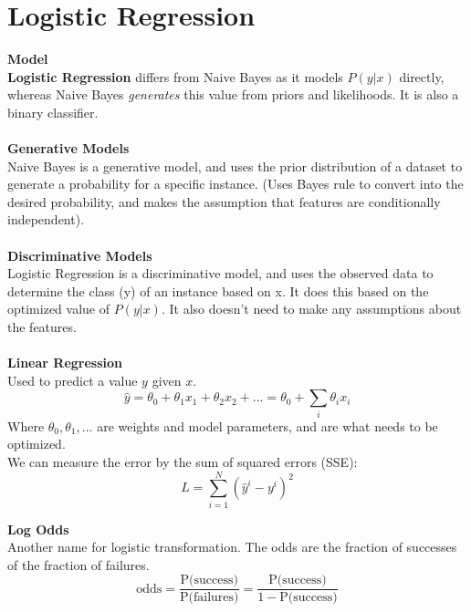 \documentclass[a4paper,10pt]{article}
\begin{document}
\section*{Logistic Regression}
\textcolor{Periwinkle}{\textbf{Model}}\\
\textbf{Logistic Regression} differs from Naive Bayes as it models $P(y|x)$ directly, whereas Naive Bayes \emph{generates} this value from priors and likelihoods. It is also a binary classifier. \\\\
\textcolor{Periwinkle}{\textbf{Generative Models}}\\
Naive Bayes is a generative model, and uses the prior distribution of a dataset to generate a probability for a specific instance. (Uses Bayes rule to convert into the desired probability, and makes the assumption that features are conditionally independent). \\\\
\textcolor{Periwinkle}{\textbf{Discriminative Models}}\\
Logistic Regression is a discriminative model, and uses the observed data to determine the class (y) of an instance based on x. It does this based on the optimized value of $P(y|x)$. It also doesn't need to make any assumptions about the features. \\\\
\textcolor{Periwinkle}{\textbf{Linear Regression}}\\
Used to predict a value $y$ given $x$. 
\begin{equation*}
	\hat{y} = \theta_{0} + \theta_{1}x_{1} + \theta_{2}x_{2} + ... = \theta_{0} + \sum_{i} \theta_{i}x_{i}
\end{equation*}
Where $\theta_{0}, \theta_{1}, ...$ are weights and model parameters, and are what needs to be optimized. \\
We can measure the error by the sum of squared errors (SSE): 
\begin{equation*}
	L = \sum_{i=1}^{N}(\hat{y}^{i} - y^{i})^{2}
\end{equation*}
\begin{shaded}
	\noindent \textcolor{RoyalPurple}{\textbf{Log Odds}}\\
	Another name for logistic transformation. The odds are the fraction of successes of the fraction of failures. \\
	\begin{equation*}
		\text{odds} = \dfrac{\text{P(success)}}{\text{P(failures)}} = \dfrac{\text{P(success)}}{1 - \text{P(success)}}
	\end{equation*}
\end{shaded}
\end{document}
